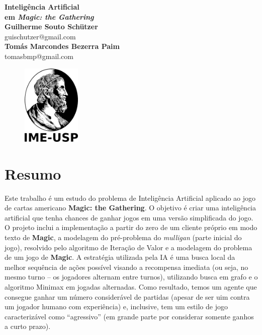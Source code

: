 \documentclass[dvipsnames]{book}
\begin{document}
  \begin{titlepage}
  \begin{center}
   {\huge\bfseries Inteligência Artificial \\ em \textit{Magic: the Gathering}\\}
   \vspace{1.5cm}
   {\bfseries Guilherme Souto Schützer}\\[5pt]
   guischutzer@gmail.com\\[14pt]
   \vspace{0.5cm}
   {\bfseries Tomás Marcondes Bezerra Paim}\\[5pt]
   tomasbmp@gmail.com\\[14pt]
   \vspace{2cm}
  {\begin{figure}[!h]
          \centering
              \includegraphics[width=0.25\textwidth]{picstcc/ime.png}
  \end{figure}}
   \vspace{0.4cm}
 \end{center}
  \end{titlepage}

\chapter*{Resumo}
Este trabalho é um estudo do problema de Inteligência Artificial aplicado ao jogo de cartas americano \textbf{Magic: the Gathering}. O objetivo é criar uma inteligência artificial que tenha chances de ganhar jogos em uma versão simplificada do jogo. O projeto inclui a implementação a partir do zero de um cliente próprio em modo texto de \textbf{Magic}, a modelagem do pré-problema do \textit{mulligan} (parte inicial do jogo), resolvido pelo algoritmo de Iteração de Valor e a modelagem do problema de um jogo de \textbf{Magic}. A estratégia utilizada pela IA é uma busca local da melhor sequência de ações possível visando a recompensa imediata (ou seja, no mesmo turno -- os jogadores alternam entre turnos), utilizando busca em grafo e o algoritmo Minimax em jogadas alternadas. Como resultado, temos um agente que consegue ganhar um número considerável de partidas (apesar de ser uim contra um jogador humano com experiência) e, inclusive, tem um estilo de jogo caracterizável como ``agressivo'' (em grande parte por considerar somente ganhos a curto prazo).
\end{document}
